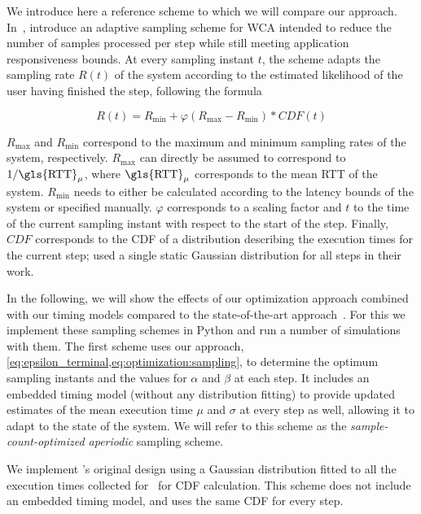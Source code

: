 \medskip

We introduce here a reference scheme to which we will compare our approach.
In~\cite{wang2019towards}, \citeauthor{wang2019towards} introduce an adaptive sampling scheme for \gls{WCA} intended to reduce the number of samples processed per step while still meeting application responsiveness bounds.
At every sampling instant \( t \), the scheme adapts the sampling rate \( R(t) \) of the system according to the estimated likelihood of the user having finished the step,
following the formula 

\begin{equation}
    R(t) = R_\text{min} + \varphi\left( R_\text{max} - R_\text{min} \right) * CDF(t)
\end{equation}

\( R_\text{max} \) and \( R_\text{min} \) correspond to the maximum and minimum sampling rates of the system, respectively.
\( R_\text{max} \) can directly be assumed to correspond to \( 1 / \text{\gls{RTT}}_\mu \), where \( \text{\gls{RTT}}_\mu \) corresponds to the mean \gls{RTT} of the system.
\( R_\text{min} \) needs to either be calculated according to the latency bounds of the system or specified manually.
\( \varphi \) corresponds to a scaling factor and \( t \) to the time of the current sampling instant with respect to the start of the step.
Finally, \( CDF \) corresponds to the \gls{CDF} of a distribution describing the execution times for the current step; \citeauthor{wang2019towards} used a single static Gaussian distribution for all steps in their work.

\medskip

In the following, we will show the effects of our optimization approach combined with our timing models compared to the state-of-the-art approach~\cite{wang2019towards}.
For this we implement these sampling schemes in Python and run a number of simulations with them.
The first scheme uses our approach, \cref{eq:epsilon_terminal,eq:optimization:sampling}, to determine the optimum sampling instants and the values for \( \alpha \) and \( \beta \) at each step.
It includes an embedded timing model (without any distribution fitting) to provide updated estimates of the mean execution time \( \mu \) and \( \sigma \) at every step as well, allowing it to adapt to the state of the system.
We will refer to this scheme as the \emph{sample-count-optimized aperiodic} sampling scheme.

We implement \citeauthor{wang2019towards}'s original design using a Gaussian distribution fitted to all the execution times collected for~\cite{olguinmunoz2021impact} for \gls{CDF} calculation.
This scheme does not include an embedded timing model, and uses the same \gls{CDF} for every step.

